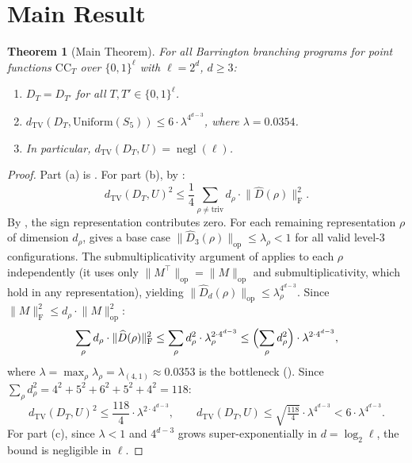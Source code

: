 \documentclass[11pt]{article}
\newtheorem{theorem}{Theorem}[section]
\DeclareMathOperator{\negl}{negl}
\newcommand{\norm}[1]{\lVert #1 \rVert}
\newcommand{\frob}[1]{\norm{#1}_{\mathrm{F}}}
\newcommand{\opn}[1]{\norm{#1}_{\mathrm{op}}}
\newcommand{\dtv}{d_{\mathrm{TV}}}
\newcommand{\Dhat}{\widehat{D}}
\newcommand{\CC}{\mathrm{CC}}
\begin{document}
\section{Main Result}
\label{sec:main}

\begin{theorem}[Main Theorem]
\label{thm:main}
For all Barrington branching programs for point functions $\CC_T$ over
$\{0,1\}^\ell$ with $\ell = 2^d$, $d \geq 3$:
\begin{enumerate}[label=(\alph*),nosep]
\item $D_T = D_{T'}$ for all $T, T' \in \{0,1\}^\ell$.
\item $\dtv(D_T, \mathrm{Uniform}(S_5)) \leq 6 \cdot \lambda^{4^{d-3}}$,
  where $\lambda = 0.0354$.
\item In particular, $\dtv(D_T, U) = \negl(\ell)$.
\end{enumerate}
\end{theorem}

\begin{proof}
Part (a) is . For part (b), by :
\[
\dtv(D_T, U)^2 \leq \frac{1}{4} \sum_{\rho \neq \mathrm{triv}} d_\rho \cdot
\frob{\Dhat(\rho)}^2.
\]
By , the sign representation contributes zero.
For each remaining representation $\rho$ of dimension $d_\rho$,
 gives a base case
$\opn{\Dhat_3(\rho)} \leq \lambda_\rho < 1$ for all valid level-$3$
configurations. The submultiplicativity argument of 
applies to each $\rho$ independently (it uses only $\opn{M^\top} = \opn{M}$
and submultiplicativity, which hold in any representation), yielding
$\opn{\Dhat_d(\rho)} \leq \lambda_\rho^{4^{d-3}}$.
Since $\frob{M}^2 \leq d_\rho \cdot \opn{M}^2$:
\[
\sum_{\rho} d_\rho \cdot \frob{\Dhat(\rho)}^2
\leq \sum_{\rho} d_\rho^2 \cdot \lambda_\rho^{2 \cdot 4^{d-3}}
\leq \Bigl(\sum_{\rho} d_\rho^2\Bigr) \cdot \lambda^{2 \cdot 4^{d-3}},
\]
where $\lambda = \max_\rho \lambda_\rho = \lambda_{(4,1)} \approx 0.0353$
is the bottleneck (). Since
$\sum_\rho d_\rho^2 = 4^2 + 5^2 + 6^2 + 5^2 + 4^2 = 118$:
\[
\dtv(D_T, U)^2 \leq \frac{118}{4} \cdot \lambda^{2 \cdot 4^{d-3}},
\qquad
\dtv(D_T, U) \leq \sqrt{\tfrac{118}{4}} \cdot \lambda^{4^{d-3}}
< 6 \cdot \lambda^{4^{d-3}}.
\]
For part (c), since $\lambda < 1$ and $4^{d-3}$ grows super-exponentially in
$d = \log_2 \ell$, the bound is negligible in $\ell$.
\end{proof}
\end{document}
